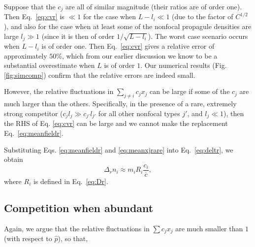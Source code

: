 \documentclass[12pt]{article}
\begin{document}
Suppose that the $c_j$ are all of similar magnitude (their ratios are of order one). Then Eq.~\eqref{eq:cvr} is $\ll 1$ for the case when $L-l_i \ll 1$ (due to the factor of $C^{1/2}$), and also for the case when at least some of the nonfocal propagule densities are large $l_j\gg 1$ (since it is then of order $1/\sqrt{L-l_i}$). The worst case scenario occurs when $L-l_i$ is of order one. Then Eq.~\eqref{eq:cvr} gives a relative error of approximately $50\%$, which from our earlier discussion we know to be a substantial overestimate when $L$ is of order $1$. Our numerical results (Fig. \ref{fig:simcomp}) confirm that the relative errors are indeed small.

However, the relative fluctuations in $\sum_{j\neq i} c_j x_j$ can be large if some of the $c_j$ are much larger than the others. Specifically, in the presence of a rare, extremely strong competitor ($c_j l_j\gg c_{j'} l_{j'}$ for all other nonfocal types $j'$, and $l_j\ll 1$), then the RHS of Eq. \eqref{eq:cvr} can be large and we cannot make the replacement Eq.~\eqref{eq:meanfieldr}. 

Substituting Eqs. \eqref{eq:meanfieldr} and \eqref{eq:meanxjrare} into Eq.~\eqref{eq:deltr}, we obtain
\begin{equation}
\Delta_r n_i\approx m_i R_i\frac{c_i}{\overline{c}}, \label{eq:deltrfinal}
\end{equation}
where $R_i$ is defined in Eq.~\eqref{eq:Dr}.

\subsection*{Competition when abundant}



Again, we argue that the relative fluctuations in $\sum c_j x_j$ are much smaller than $1$ (with respect to $\hat{p}$), so that,
\end{document}
